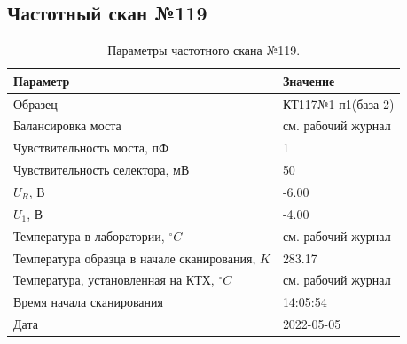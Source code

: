 \subsection{Частотный скан №119}
\begin{table}[!ht]
    \centering
    \caption{Параметры частотного скана №119.}
    \begin{tabular}{|l|l|}
        \hline
        Параметр                                       & Значение                  \\ \hline
        Образец                                        & КТ117№1 п1(база 2)        \\ \hline
        Балансировка моста                             & см. рабочий журнал        \\ \hline
        Чувствительность моста, пФ                     & 1                         \\ \hline
        Чувствительность селектора, мВ                 & 50                        \\ \hline
        $U_R$, В                                       & -6.00                     \\ \hline
        $U_1$, В                                       & -4.00                     \\ \hline
        Температура в лаборатории, $^\circ C$          & см. рабочий журнал        \\ \hline
        Температура образца в начале сканирования, $K$ & 283.17                    \\ \hline
        Температура, установленная на КТХ, $^\circ C$  & см. рабочий журнал        \\ \hline
        Время начала сканирования                      & 14:05:54                  \\ \hline
        Дата                                           & 2022-05-05                \\ \hline
    \end{tabular}
    \label{table:frequency_scan_119}
\end{table}

